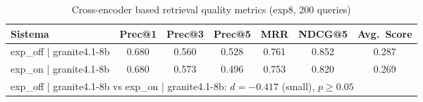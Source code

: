 \begin{table}[htbp]
\centering
\caption{Cross-encoder based retrieval quality metrics (exp8, 200 queries)}
\label{tab:retrieval-metrics}
\begin{tabular}{lcccccc}
\toprule
Sistema & Prec@1 & Prec@3 & Prec@5 & MRR & NDCG@5 & Avg.~Score \\
\midrule
exp_off | granite4.1-8b & 0.680 & 0.560 & 0.528 & 0.761 & 0.852 & 0.287 \\
exp_on | granite4.1-8b & 0.680 & 0.573 & 0.496 & 0.753 & 0.820 & 0.269 \\
\midrule
\multicolumn{7}{l}{\footnotesize exp_off | granite4.1-8b vs exp_on | granite4.1-8b: $d=-0.417$ (small), $p\geq0.05$} \\
\bottomrule
\end{tabular}
\end{table}